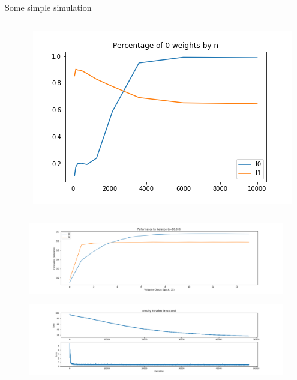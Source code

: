 \documentclass{beamer}
\begin{document}
\begin{frame}[t]{Some simple simulation}
\begin{columns}
\begin{column}{0.35\textwidth}
    \end{column}
    \begin{column}{0.35\textwidth}
      \includegraphics[width=0.99\linewidth]{./percentage_0_l0l1.png}
    \end{column}
  \end{columns}
\end{frame}

\begin{frame}[t]{}
  \begin{figure}[htpb]
    \centering
    \includegraphics[width=0.999\linewidth]{./performance_epochs_l1l0.png} \\
  \end{figure}
  \begin{figure}[htpb]
    \centering
    \includegraphics[width=0.999\linewidth]{./loss_l1l0.png} \\
  \end{figure}
\end{frame}
\end{document}
